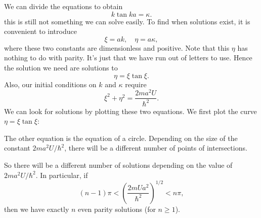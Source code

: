 \documentclass[a4paper]{article}
\begin{document}
We can divide the equations to obtain
\[
  k \tan ka = \kappa.
\]
this is still not something we can solve easily. To find when solutions exist, it is convenient to introduce
\[
  \xi = ak, \quad \eta = a\kappa,
\]
where these two constants are dimensionless and positive. Note that this $\eta$ has nothing to do with parity. It's just that we have run out of letters to use. Hence the solution we need are solutions to
\[
  \eta = \xi \tan \xi.
\]
Also, our initial conditions on $k$ and $\kappa$ require
\[
  \xi^2 + \eta^2  = \frac{2ma^2 U}{\hbar^2}.
\]
We can look for solutions by plotting these two equations. We first plot the curve $\eta = \xi \tan \xi$:
\begin{center}
\end{center}
The other equation is the equation of a circle. Depending on the size of the constant $2ma^2 U/\hbar^2$, there will be a different number of points of intersections.
\begin{center}
\end{center}
So there will be a different number of solutions depending on the value of $2ma^2 U/\hbar^2$. In particular, if
\[
  (n - 1)\pi < \left(\frac{2mUa^2}{\hbar^2}\right)^{1/2} < n\pi,
\]
then we have exactly $n$ even parity solutions (for $n \geq 1$).
\end{document}
